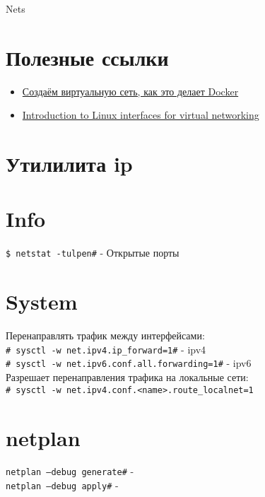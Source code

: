 \documentclass[12pt, a4paper]{article}
\newcommand{\cci}[2]{\indent\texttt{#1\indent \#} - #2 \\}
\newcommand{\ccn}[2]{\noindent\texttt{#1\indent \#} - #2 \\}
\newcommand{\tc}[2]{\noindent #2 \\ \indent\texttt{#1} \\}
\begin{document}
	
	\begin{center} {\Huge Nets} \end{center}

	\section{Полезные ссылки}
	\begin{itemize}
		\item \href{https://habr.com/ru/articles/794262/}{Создаём виртуальную сеть, как это делает Docker}
		\item \href{https://developers.redhat.com/blog/2018/10/22/introduction-to-linux-interfaces-for-virtual-networking}{Introduction to Linux interfaces for virtual networking}
	\end{itemize}
	
	\section{Утилилита ip}
	

	\section{Info}
	\ccn{\$ netstat -tulpen}{Открытые порты}
	
	\section{System}
	\noindent Перенаправлять трафик между интерфейсами: \\
	\cci{\# sysctl -w net.ipv4.ip\_forward=1}{ipv4}
	\cci{\# sysctl -w net.ipv6.conf.all.forwarding=1}{ipv6}
	\tc{\# sysctl -w net.ipv4.conf.<name>.route\_localnet=1}{Разрешает перенаправления трафика на локальные сети:}
	
	\section{netplan}
	\ccn{netplan --debug generate}{}
	\ccn{netplan --debug apply}{}
	
	
\end{document}
